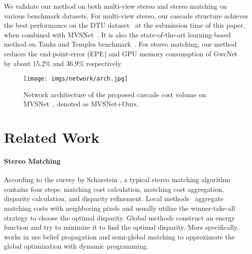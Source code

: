 \documentclass[10pt,twocolumn,letterpaper]{article}
\begin{document}
We validate our method on both multi-view stereo and stereo matching on various benchmark datasets. For multi-view stereo, our cascade structure achieves the best performance on the DTU dataset~\cite{aanaes2016dtu} at the submission time of this paper, when combined with  MVSNet~\cite{yao2018mvsnet}.
It is also the state-of-the-art
learning-based method on Tanks and Temples benchmark~\cite{knapitsch2017tanks}.
For stereo matching, our method reduces the end-point-error (EPE) and GPU memory consumption of GwcNet~\cite{guo2019group} by about 15.2\% and 36.9\% respectively.
 

\begin{figure*}[ht]
\begin{center}
\texttt{[image: imgs/network/arch.jpg]}
\end{center}
\vspace{-4mm}
   \caption{Network architecture of the proposed cascade cost volume on MVSNet~\cite{yao2018mvsnet}, denoted as MVSNet+Ours.}
\vspace{-4mm}
\label{fig:arc}
\end{figure*}


\section{Related Work} 
\paragraph{Stereo Matching}
According to the survey by Scharstein  \cite{scharstein2002taxonomy}, a typical stereo matching algorithm contains four steps: matching cost calculation, matching cost aggregation, disparity calculation, and disparity refinement. Local methods~\cite{zhang2009cross, yang2012non, mei2013segment_gwc20} aggregate matching costs with neighboring pixels and usually utilize the winner-take-all strategy to choose the optimal disparity. Global methods \cite{sun2003stereo_gwc30,klaus2006segment_gwc13,hirschmuller2005accurate_gwc7} construct an energy function and try to minimize it to find the optimal disparity.
More specifically, works in \cite{sun2003stereo_gwc30,klaus2006segment_gwc13} use  belief propagation and semi-global matching \cite{hirschmuller2005accurate_gwc7} to approximate the global optimization with dynamic programming. 
\end{document}
